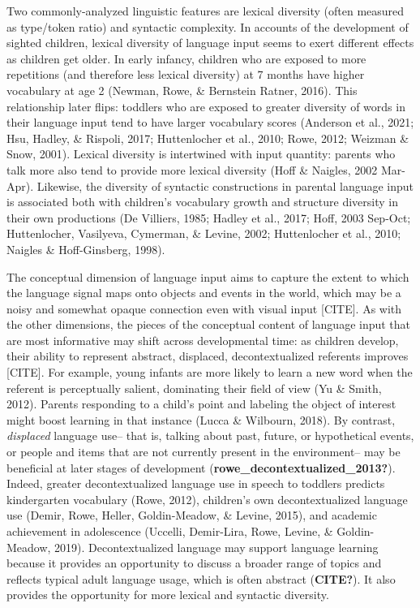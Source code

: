 \documentclass[
  man,floatsintext]{apa6}
\begin{document}
Two commonly-analyzed linguistic features are lexical diversity (often measured as type/token ratio) and syntactic complexity. In accounts of the development of sighted children, lexical diversity of language input seems to exert different effects as children get older. In early infancy, children who are exposed to more repetitions (and therefore less lexical diversity) at 7 months have higher vocabulary at age 2 (Newman, Rowe, \& Bernstein Ratner, 2016). This relationship later flips: toddlers who are exposed to greater diversity of words in their language input tend to have larger vocabulary scores (Anderson et al., 2021; Hsu, Hadley, \& Rispoli, 2017; Huttenlocher et al., 2010; Rowe, 2012; Weizman \& Snow, 2001). Lexical diversity is intertwined with input quantity: parents who talk more also tend to provide more lexical diversity (Hoff \& Naigles, 2002 Mar-Apr). Likewise, the diversity of syntactic constructions in parental language input is associated both with children's vocabulary growth and structure diversity in their own productions (De Villiers, 1985; Hadley et al., 2017; Hoff, 2003 Sep-Oct; Huttenlocher, Vasilyeva, Cymerman, \& Levine, 2002; Huttenlocher et al., 2010; Naigles \& Hoff-Ginsberg, 1998).

The conceptual dimension of language input aims to capture the extent to which the language signal maps onto objects and events in the world, which may be a noisy and somewhat opaque connection even with visual input {[}CITE{]}. As with the other dimensions, the pieces of the conceptual content of language input that are most informative may shift across developmental time: as children develop, their ability to represent abstract, displaced, decontextualized referents improves {[}CITE{]}. For example, young infants are more likely to learn a new word when the referent is perceptually salient, dominating their field of view (Yu \& Smith, 2012). Parents responding to a child's point and labeling the object of interest might boost learning in that instance (Lucca \& Wilbourn, 2018). By contrast, \emph{displaced} language use-- that is, talking about past, future, or hypothetical events, or people and items that are not currently present in the environment-- may be beneficial at later stages of development (\textbf{rowe\_decontextualized\_2013?}). Indeed, greater decontextualized language use in speech to toddlers predicts kindergarten vocabulary (Rowe, 2012), children's own decontextualized language use (Demir, Rowe, Heller, Goldin-Meadow, \& Levine, 2015), and academic achievement in adolescence (Uccelli, Demir-Lira, Rowe, Levine, \& Goldin-Meadow, 2019). Decontextualized language may support language learning because it provides an opportunity to discuss a broader range of topics and reflects typical adult language usage, which is often abstract (\textbf{CITE?}). It also provides the opportunity for more lexical and syntactic diversity.
\end{document}

